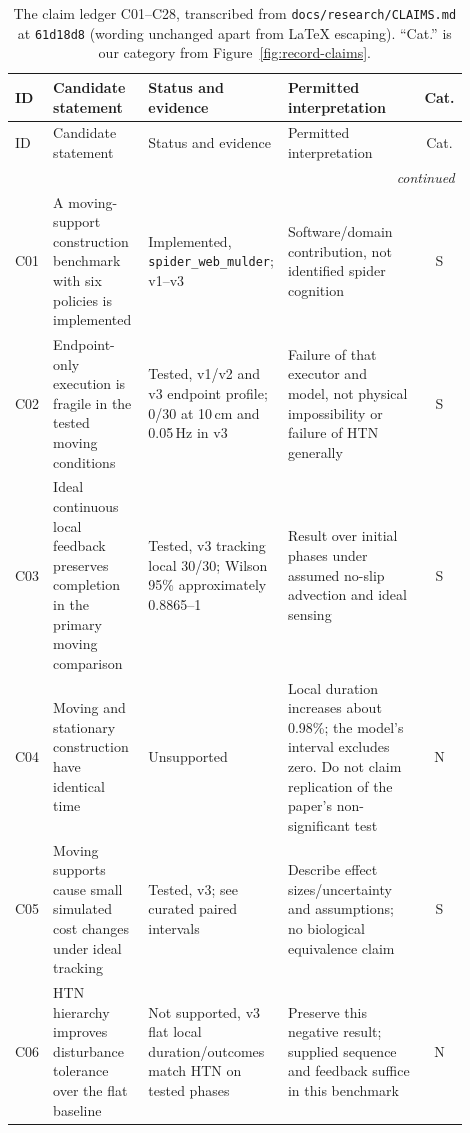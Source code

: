 {\footnotesize
\setlength{\tabcolsep}{3pt}
\renewcommand{\arraystretch}{1.12}
\begin{longtable}{@{}p{0.045\linewidth}p{0.22\linewidth}p{0.27\linewidth}p{0.36\linewidth}c@{}}
\caption{The claim ledger C01--C28, transcribed from \texttt{docs/\allowbreak{}research/\allowbreak{}CLAIMS.md} at \texttt{61d18d8}
(wording unchanged apart from \LaTeX{} escaping). ``Cat.'' is our category from
Figure~\ref{fig:record-claims}.}
\label{tab:record-ledger}\\
\toprule
ID & Candidate statement & Status and evidence & Permitted interpretation & Cat. \\
\midrule
\endfirsthead
\toprule
ID & Candidate statement & Status and evidence & Permitted interpretation & Cat. \\
\midrule
\endhead
\midrule
\multicolumn{5}{r}{\emph{continued}}\\
\endfoot
\bottomrule
\endlastfoot
C01 & A moving-support construction benchmark with six policies is implemented & Implemented,
  \texttt{spider\_\allowbreak{}web\_\allowbreak{}mulder}; v1--v3 & Software/domain contribution, not identified spider cognition & S \\
C02 & Endpoint-only execution is fragile in the tested moving conditions & Tested, v1/v2 and v3 endpoint profile;
  0/30 at 10\,cm and 0.05\,Hz in v3 & Failure of that executor and model, not physical impossibility or failure of
  HTN generally & S \\
C03 & Ideal continuous local feedback preserves completion in the primary moving comparison & Tested, v3 tracking
  local 30/30; Wilson 95\% approximately 0.8865--1 & Result over initial phases under assumed no-slip advection
  and ideal sensing & S \\
C04 & Moving and stationary construction have identical time & Unsupported & Local duration increases about
  0.98\%; the model's interval excludes zero. Do not claim replication of the paper's non-significant test & N \\
C05 & Moving supports cause small simulated cost changes under ideal tracking & Tested, v3; see curated paired
  intervals & Describe effect sizes/uncertainty and assumptions; no biological equivalence claim & S \\
C06 & HTN hierarchy improves disturbance tolerance over the flat baseline & Not supported, v3 flat local
  duration/outcomes match HTN on tested phases & Preserve this negative result; supplied sequence and feedback
  suffice in this benchmark & N \\

\end{longtable}}

